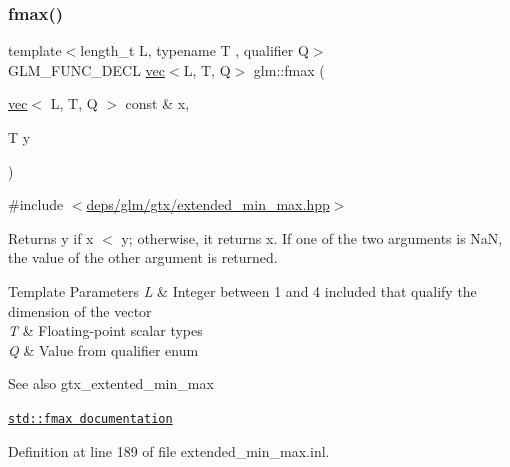 \subsubsection{\texorpdfstring{fmax()}{fmax()}\hspace{0.1cm}{\footnotesize\ttfamily [2/3]}}
{\footnotesize\ttfamily template$<$length\+\_\+t L, typename T , qualifier Q$>$ \\
G\+L\+M\+\_\+\+F\+U\+N\+C\+\_\+\+D\+E\+CL \hyperlink{structglm_1_1vec}{vec}$<$L, T, Q$>$ glm\+::fmax (\begin{DoxyParamCaption}\item[{\hyperlink{structglm_1_1vec}{vec}$<$ L, T, Q $>$ const \&}]{x,  }\item[{T}]{y }\end{DoxyParamCaption})}



{\ttfamily \#include $<$\hyperlink{extended__min__max_8hpp}{deps/glm/gtx/extended\+\_\+min\+\_\+max.\+hpp}$>$}

Returns y if x $<$ y; otherwise, it returns x. If one of the two arguments is NaN, the value of the other argument is returned.


\begin{DoxyTemplParams}{Template Parameters}
{\em L} & Integer between 1 and 4 included that qualify the dimension of the vector \\
\hline
{\em T} & Floating-\/point scalar types \\
\hline
{\em Q} & Value from qualifier enum\\
\hline
\end{DoxyTemplParams}
\begin{DoxySeeAlso}{See also}
gtx\+\_\+extented\+\_\+min\+\_\+max 

\href{http://en.cppreference.com/w/cpp/numeric/math/fmax}{\tt std\+::fmax documentation} 
\end{DoxySeeAlso}


Definition at line 189 of file extended\+\_\+min\+\_\+max.\+inl.

\mbox{\label{group__gtx__extended__min__max_ga538c9e7de1d0cb8157e548691487d32a}} 
